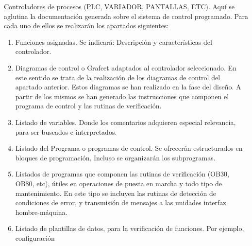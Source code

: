 \clearpage
{}
Controladores de procesos (PLC, VARIADOR, PANTALLAS, ETC). Aquí se aglutina la
documentación generada sobre el sistema de control programado.
Para cada uno de ellos se realizarán los apartados siguientes:
\begin{enumerate}
	\item Funciones asignadas. Se indicará: Descripción y características del controlador.
	\item Diagramas de control o Grafcet adaptados al controlador seleccionado. En este sentido se trata
	      de la realización de los diagramas de control del apartado anterior. Estos diagramas se han
	      realizado en la fase del diseño. A partir de los mismos se han generado las instrucciones que
	      componen el programa de control y las rutinas de verificación.
	\item Listado de variables. Donde los comentarios adquieren especial relevancia, para ser buscados
	      e interpretados.
	\item Listado del Programa o programas de control. Se ofrecerán estructurados en bloques de
	      programación. Incluso se organizarán los subprogramas.
	\item Listados de programas que componen las rutinas de verificación (OB30, OB80, etc), útiles en
	      operaciones de puesta en marcha y todo tipo de mantenimiento. En este tipo se incluyen las
	      rutinas de detección de condiciones de error, y transmisión de mensajes a las unidades interfaz
	      hombre-máquina.
	\item Listado de plantillas de datos, para la verificación de funciones. Por ejemplo, configuración
\end{enumerate}
